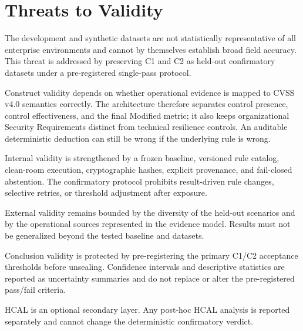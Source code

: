 \section{Threats to Validity}
\label{sec:threats}

The development and synthetic datasets are not statistically representative of
all enterprise environments and cannot by themselves establish broad field
accuracy. This threat is addressed by preserving C1 and C2 as held-out
confirmatory datasets under a pre-registered single-pass protocol.

Construct validity depends on whether operational evidence is mapped to CVSS
v4.0 semantics correctly. The architecture therefore separates control
presence, control effectiveness, and the final Modified metric; it also keeps
organizational Security Requirements distinct from technical resilience
controls. An auditable deterministic deduction can still be wrong if the
underlying rule is wrong.

Internal validity is strengthened by a frozen baseline, versioned rule catalog,
clean-room execution, cryptographic hashes, explicit provenance, and
fail-closed abstention. The confirmatory protocol prohibits result-driven rule
changes, selective retries, or threshold adjustment after exposure.

External validity remains bounded by the diversity of the held-out scenarios
and by the operational sources represented in the evidence model. Results must
not be generalized beyond the tested baseline and datasets.

Conclusion validity is protected by pre-registering the primary C1/C2
acceptance thresholds before unsealing. Confidence intervals and descriptive
statistics are reported as uncertainty summaries and do not replace or alter
the pre-registered pass/fail criteria.

HCAL is an optional secondary layer. Any post-hoc HCAL analysis is reported
separately and cannot change the deterministic confirmatory verdict.
